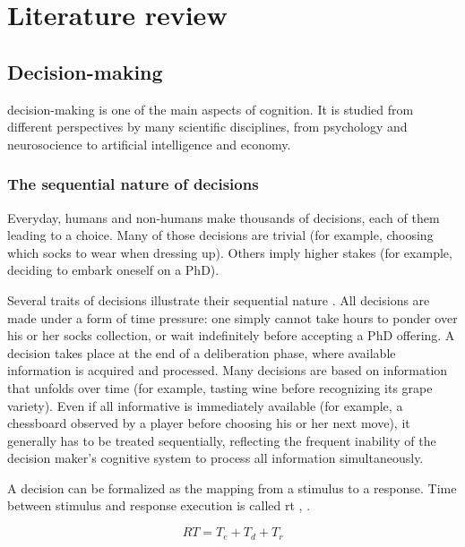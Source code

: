 \chapter{Literature review}

\section{Decision-making}


\Gls{decision-making} is one of the main aspects of cognition. It is studied from different perspectives by many scientific disciplines, from psychology and neurosocience to artificial intelligence and economy.

\subsection{The sequential nature of decisions}

Everyday, humans and non-humans make thousands of \glspl{decision}, each of them leading to a \gls{choice}. Many of those decisions are trivial (for example, choosing which socks to wear when dressing up). Others imply higher stakes (for example, deciding to embark oneself on a PhD).

Several traits of decisions illustrate their sequential nature \cite{forstmannSequentialSamplingModels2016}. All decisions are made under a form of time pressure: one simply cannot take hours to ponder over his or her socks collection, or wait indefinitely before accepting a PhD offering. A decision takes place at the end of a deliberation phase, where available information is acquired and processed. Many decisions are based on information that unfolds over time (for example, tasting wine before recognizing its grape variety). Even if all informative is immediately available (for example, a chessboard observed by a player before choosing his or her next move), it generally has to be treated sequentially, reflecting the frequent inability of the decision maker's cognitive system to process all information simultaneously.

A decision can be formalized as the mapping from a stimulus to a response. Time between stimulus and response execution is called \acrfull{rt} \cite{forstmannSequentialSamplingModels2016}, \cite{myersPracticalIntroductionUsing2022}.

$$RT = T_e+T_d+T_r$$


